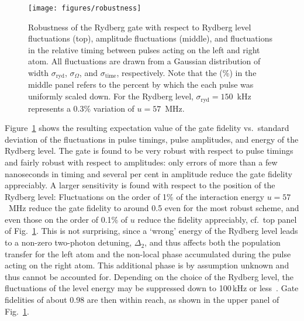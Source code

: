 \begin{figure}[tb]
  \centering
  \texttt{[image: figures/robustness]}
  \caption{%
    Robustness of the Rydberg gate with respect
    to Rydberg level fluctuations (top), amplitude fluctuations
    (middle), and fluctuations in the relative timing between
    pulses acting on the left and right atom. All fluctuations are
    drawn from a Gaussian distribution of width $\sigma_{\text{ryd}}$,
    $\sigma_{\Omega}$, and $\sigma_{\text{time}}$, respectively. Note
    that the (\%) in the middle panel refers to the percent by which the
    each pulse was uniformly scaled down. For the Rydberg level,
    $\sigma_{\text{ryd}} = 150$~kHz represents a $0.3\%$ variation of
    $u=57$~MHz.}
  \label{fig:pulserobust}
\end{figure}
Figure~\ref{fig:pulserobust} shows the resulting expectation value of the
gate fidelity vs.\ standard
deviation of the fluctuations in pulse timings, pulse amplitudes,
and energy of the Rydberg level.
The gate is found to be very robust with respect to pulse timings
and fairly robust with respect to amplitudes: only errors of more
than a few nanoseconds in timing and several per cent in amplitude
reduce the gate fidelity appreciably.
A larger sensitivity is found with respect to the position of the Rydberg level:
Fluctuations on the order of 1\% of the interaction energy $u=57$~MHz reduce
the gate fidelity to around 0.5 even for the most robust scheme, and even those
on the order of 0.1\% of $u$ reduce the fidelity appreciably, cf.\ top
panel of Fig.~\ref{fig:pulserobust}. This is not surprising, since a
`wrong' energy of the Rydberg level leads to a non-zero two-photon
detuning, $\Delta_2$, and thus affects both the population
transfer for the left atom and the non-local phase accumulated during
the pulse acting on the right atom. This additional phase is by assumption
unknown and thus cannot be accounted for. Depending on the choice of the
Rydberg level, the fluctuations of the level energy may be
suppressed down to 100$\,$kHz or less~\cite{Saffman_pc}.
Gate fidelities of about 0.98 are then
within reach, as shown in the upper panel of Fig.~\ref{fig:pulserobust}.

